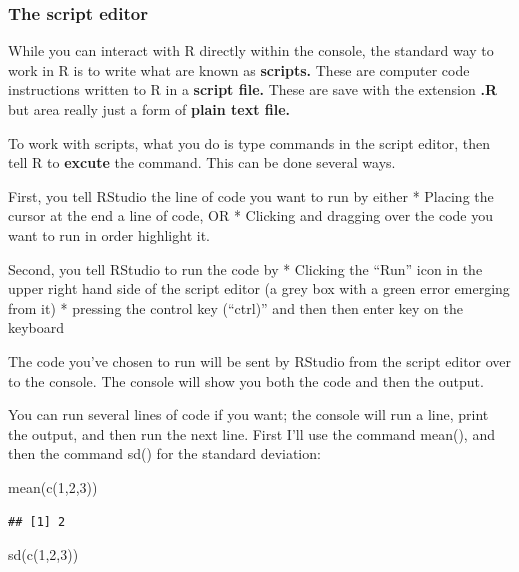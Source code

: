 \documentclass[
]{book}
\newenvironment{Shaded}{\begin{snugshade}}{\end{snugshade}}
\newcommand{\DecValTok}[1]{\textcolor[rgb]{0.00,0.00,0.81}{#1}}
\newcommand{\FunctionTok}[1]{\textcolor[rgb]{0.00,0.00,0.00}{#1}}
\newcommand{\NormalTok}[1]{#1}
\begin{document}
\hypertarget{the-script-editor}{%
\subsubsection{The script editor}\label{the-script-editor}}

While you can interact with R directly within the console, the standard way to work in R is to write what are known as \textbf{scripts.} These are computer code instructions written to R in a \textbf{script file.} These are save with the extension \textbf{.R} but area really just a form of \textbf{plain text file.}

To work with scripts, what you do is type commands in the script editor, then tell R to \textbf{excute} the command. This can be done several ways.

First, you tell RStudio the line of code you want to run by either
* Placing the cursor at the end a line of code, OR
* Clicking and dragging over the code you want to run in order highlight it.

Second, you tell RStudio to run the code by
* Clicking the ``Run'' icon in the upper right hand side of the script editor (a grey box with a green error emerging from it)
* pressing the control key (``ctrl)'' and then then enter key on the keyboard

The code you've chosen to run will be sent by RStudio from the script editor over to the console. The console will show you both the code and then the output.

You can run several lines of code if you want; the console will run a line, print the output, and then run the next line. First I'll use the command mean(), and then the command sd() for the standard deviation:

\begin{Shaded}
\begin{Highlighting}[]
\FunctionTok{mean}\NormalTok{(}\FunctionTok{c}\NormalTok{(}\DecValTok{1}\NormalTok{,}\DecValTok{2}\NormalTok{,}\DecValTok{3}\NormalTok{))}
\end{Highlighting}
\end{Shaded}

\begin{verbatim}
## [1] 2
\end{verbatim}

\begin{Shaded}
\begin{Highlighting}[]
\FunctionTok{sd}\NormalTok{(}\FunctionTok{c}\NormalTok{(}\DecValTok{1}\NormalTok{,}\DecValTok{2}\NormalTok{,}\DecValTok{3}\NormalTok{))}
\end{Highlighting}
\end{Shaded}
\end{document}
